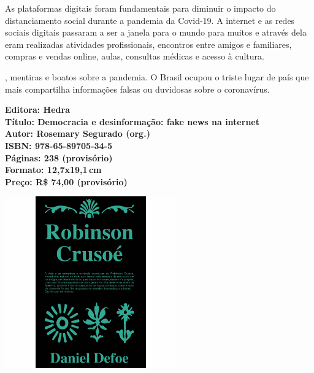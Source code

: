 \noindent{}As plataformas digitais foram fundamentais para diminuir o impacto do distanciamento social durante a pandemia da Covid-19. A internet e as redes sociais digitais passaram a ser a janela para o mundo para muitos e através dela eram realizadas atividades profissionais, encontros entre amigos e familiares, compras e vendas online, aulas, consultas médicas e acesso à cultura. 

, mentiras e boatos sobre a pandemia. O Brasil ocupou o triste lugar de país que mais compartilha informações falsas ou duvidosas sobre o coronavírus.

\vfill
\noindent\begin{minipage}[c]{1\linewidth}
{\small\textbf{
\hspace*{-.1cm}Editora: Hedra\\
Título: Democracia e desinformação: fake news na internet\\
Autor: Rosemary Segurado (org.)\\ 
ISBN: 978-65-89705-34-5\\
Páginas: 238 (provisório)\\
Formato: 12,7x19,1\,cm\\
Preço: R\$ 74,00 (provisório)\\
}}
\end{minipage}
\pagebreak

\begin{center}
\hspace*{.5cm}\includegraphics[width=74mm]{./CAPAS/HEDRA_ROBINSON.jpg}
\end{center}
\hspace*{-7cm}\hrulefill\hspace*{-7cm}
\medskip

